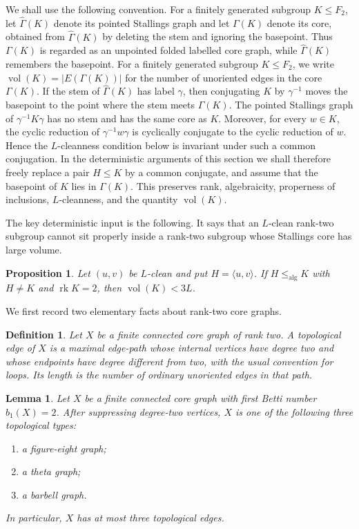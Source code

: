\documentclass{amsproc}
\newtheorem{proposition}[theorem]{Proposition}
\newtheorem{lemma}[theorem]{Lemma}
\newtheorem{definition}[theorem]{Definition}
\newcommand{\rk}{\operatorname{rk}}
\newcommand{\vol}{\operatorname{vol}}
\newcommand{\alg}{\operatorname{alg}}
\begin{document}
We shall use the following convention.  For a finitely generated subgroup
\(K\leq F_2\), let \(\widehat\Gamma(K)\) denote its pointed Stallings graph and
let \(\Gamma(K)\) denote its core, obtained from \(\widehat\Gamma(K)\) by deleting
the stem and ignoring the basepoint. Thus \(\Gamma(K)\) is regarded as an unpointed folded labelled core
graph, while \(\widehat\Gamma(K)\) remembers the basepoint. For a finitely generated subgroup \(K\leq F_2\), we write
$
        \operatorname{vol}(K)=|E(\Gamma(K))|
$
for the number of unoriented edges in the core $\Gamma(K)$.
If the stem of \(\widehat\Gamma(K)\) has label \(\gamma\), then conjugating
\(K\) by \(\gamma^{-1}\) moves the basepoint to the point where the stem meets
\(\Gamma(K)\).  The pointed Stallings graph of \(\gamma^{-1}K\gamma\) has no
stem and has the same core as \(K\).  Moreover, for every \(w\in K\), the cyclic
reduction of \(\gamma^{-1}w\gamma\) is cyclically conjugate to the cyclic
reduction of \(w\).  Hence the \(L\)-cleanness condition below is invariant under
such a common conjugation.
In the deterministic arguments of this section we shall therefore freely replace
a pair \(H\leq K\) by a common conjugate, and assume that the basepoint of
\(K\) lies in \(\Gamma(K)\).  This preserves rank, algebraicity, properness of
inclusions, \(L\)-cleanness, and the quantity
$
        \operatorname{vol}(K).
$

The key deterministic input is the following. It says that an \(L\)-clean
rank-two subgroup cannot sit properly inside a rank-two subgroup whose
Stallings core has large volume.

\begin{proposition} \label{P.volume}
Let $(u,v)$ be $L$-clean and put $H=\langle u,v\rangle$.
If $H\leq_{\alg}K$ with $H \not =K$ and $\rk K=2$, then $\vol(K)<3L$.
\end{proposition}

We first record two elementary facts about rank-two core graphs. 

\begin{definition}
Let $X$ be a finite connected core graph of rank two.  A \emph{topological
edge} of $X$ is a maximal edge-path whose internal vertices have degree two and
whose endpoints have degree different from two, with the usual convention for
loops.  Its length is the number of ordinary unoriented edges in that path.
\end{definition}

\begin{lemma}\label{lem:rank-two-core-types}
Let \(X\) be a finite connected core graph with first Betti number \(b_1(X)=2\).
After suppressing degree-two vertices, \(X\) is one of the following three
topological types:
\begin{enumerate}
    \item a figure-eight graph;
    \item a theta graph;
    \item a barbell graph.
\end{enumerate}
In particular, \(X\) has at most three topological edges.
\end{lemma}
\end{document}

